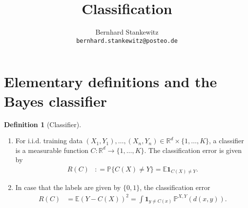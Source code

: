 \documentclass[a4paper,11pt]{article} %
\theoremstyle{definition}
\newtheorem{defi}{Definition}[section]
\theoremstyle{remark}
\theoremstyle{plain}
\numberwithin{equation}{section}
\begin{document}
\title{Classification}
\author{Bernhard Stankewitz \\ \texttt{bernhard.stankewitz@posteo.de}}
\maketitle
{}
\tableofcontents

\section{Elementary definitions and the Bayes classifier}%
\label{sec:ElementaryDefinitionsAndTheBayesClassifier}

\begin{defi}[Classifier]%
  \label{def:Classifier}
  \
  \begin{enumerate}[label=(\alph*)]
    \item For i.i.d. training data \( ( X_{1}, Y_{1} ), \dots, ( X_{n}, Y_{n} )
      \in \mathbb{R}^{d} \times \{ 1, \dots, K \} \), a classifier is a
      measurable function \( C : \mathbb{R}^{d} \to \{ 1, \dots, K \} \). The
      classification error is given by
      \begin{align*}
        R(C) 
        & : = \mathbb{P} \{ C(X) \ne Y \} 
          =   \mathbb{E} \mathbf{1}_{C(X) \ne Y}. 
      \end{align*}
    \item In case that the labels are given by \( \{ 0, 1 \} \), the
      classification error 
      \begin{align*}
        R(C) 
        & = \mathbb{E} ( Y - C(X) )^{2} 
        = \int \mathbf{1}_{y \ne C(x)} \, \mathbb{P}^{X, Y}(d(x, y)). 
      \end{align*}
  \end{enumerate}
\end{defi}%
\end{document}
